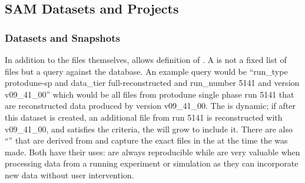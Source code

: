 \documentclass[../main-v1.tex]{subfiles}
\begin{document}


\subsection{SAM Datasets and Projects}

\subsubsection{Datasets and Snapshots}

In addition to the files themselves,  allows %
definition of .
A   is not a fixed list of files but a query against the  database. An example query would be ``run\_type protodune-sp and data\_tier full-reconstructed and run\_number 5141 and version v09\_41\_00'' which would be all files from protodune single phase run 5141 that are reconstructed data produced by version v09\_41\_00. The  is dynamic; if after this dataset is created, an additional file from run 5141 is reconstructed with v09\_41\_00, and satisfies the criteria,
 the  will grow to include it. There are also %
``'' that are derived from  and capture the exact files in the  at the time the  was made. Both have their uses:  are always reproducible while   are very valuable when processing data from a running experiment or simulation as they can incorporate new data without user intervention. 



\end{document}
